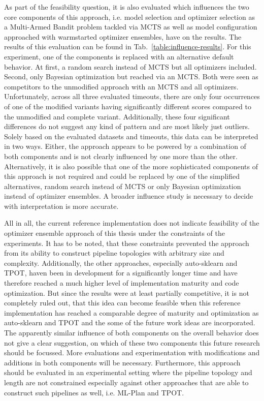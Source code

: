 As part of the feasibility question, it is also evaluated which influences the two core components of this approach, i.e. model selection and optimizer selection as a Multi-Armed Bandit problem tackled via MCTS as well as model configuration approached with warmstarted optimizer ensembles, have on the results.
The results of this evaluation can be found in Tab.~\ref{table:influence-results}.\newline
For this experiment, one of the components is replaced with an alternative default behavior.
At first, a random search instead of MCTS but all optimizers included.
Second, only Bayesian optimization but reached via an MCTS.
Both were seen as competitors to the unmodified approach with an MCTS and all optimizers.\newline
Unfortunately, across all three evaluated timeouts, there are only four occurrences of one of the modified variants having significantly different scores compared to the unmodified and complete variant.
Additionally, these four significant differences do not suggest any kind of pattern and are most likely just outliers.\newline
Solely based on the evaluated datasets and timeouts, this data can be interpreted in two ways.
Either, the approach appears to be powered by a combination of both components and is not clearly influenced by one more than the other.
Alternatively, it is also possible that one of the more sophisticated components of this approach is not required and could be replaced by one of the simplified alternatives, random search instead of MCTS or only Bayesian optimization instead of optimizer ensembles.
A broader influence study is necessary to decide with interpretation is more accurate.

All in all, the current reference implementation does not indicate feasibility of the optimizer ensemble approach of this thesis under the constraints of the experiments.
It has to be noted, that these constraints prevented the approach from its ability to construct pipeline topologies with arbitrary size and complexity.
Additionally, the other approaches, especially auto-sklearn and TPOT, haven been in development for a significantly longer time and have therefore reached a much higher level of implementation maturity and code optimization.\newline
But since the results were at least partially competitive, it is not completely ruled out, that this idea can become feasible when this reference implementation has reached a comparable degree of maturity and optimization as auto-sklearn and TPOT and the some of the future work ideas are incorporated.\newline
The apparently similar influence of both components on the overall behavior does not give a clear suggestion, on which of these two components this future research should be focussed.
More evaluations and experimentation with modifications and additions in both components will be necessary.
Furthermore, this approach should be evaluated in an experimental setting where the pipeline topology and length are not constrained especially against other approaches that are able to construct such pipelines as well, i.e. ML-Plan and TPOT.

